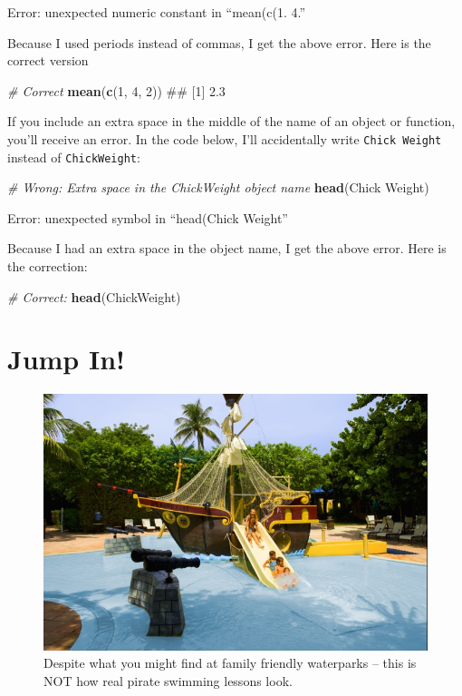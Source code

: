 \documentclass[]{book}
\newenvironment{Shaded}{\begin{snugshade}}{\end{snugshade}}
\newcommand{\KeywordTok}[1]{\textcolor[rgb]{0.13,0.29,0.53}{\textbf{#1}}}
\newcommand{\DecValTok}[1]{\textcolor[rgb]{0.00,0.00,0.81}{#1}}
\newcommand{\CommentTok}[1]{\textcolor[rgb]{0.56,0.35,0.01}{\textit{#1}}}
\newcommand{\NormalTok}[1]{#1}
\theoremstyle{definition}
\theoremstyle{definition}
\theoremstyle{remark}
\begin{document}
Error: unexpected numeric constant in ``mean(c(1. 4.''

Because I used periods instead of commas, I get the above error. Here is
the correct version

\begin{Shaded}
\begin{Highlighting}[]
\CommentTok{# Correct}
\KeywordTok{mean}\NormalTok{(}\KeywordTok{c}\NormalTok{(}\DecValTok{1}\NormalTok{, }\DecValTok{4}\NormalTok{, }\DecValTok{2}\NormalTok{))}
\NormalTok{## [1] 2.3}
\end{Highlighting}
\end{Shaded}

If you include an extra space in the middle of the name of an object or
function, you'll receive an error. In the code below, I'll accidentally
write \texttt{Chick\ Weight} instead of \texttt{ChickWeight}:

\begin{Shaded}
\begin{Highlighting}[]
\CommentTok{# Wrong: Extra space in the ChickWeight object name}
\KeywordTok{head}\NormalTok{(Chick Weight)}
\end{Highlighting}
\end{Shaded}

Error: unexpected symbol in ``head(Chick Weight''

Because I had an extra space in the object name, I get the above error.
Here is the correction:

\begin{Shaded}
\begin{Highlighting}[]
\CommentTok{# Correct:}
\KeywordTok{head}\NormalTok{(ChickWeight)}
\end{Highlighting}
\end{Shaded}

\chapter{Jump In!}\label{jumpin}

\begin{figure}

{\centering \includegraphics[width=0.75\linewidth]{images/pirateswimming} 

}

\caption{Despite what you might find at family friendly waterparks -- this is NOT how real pirate swimming lessons look.}\label{fig:unnamed-chunk-30}
\end{figure}
\end{document}
